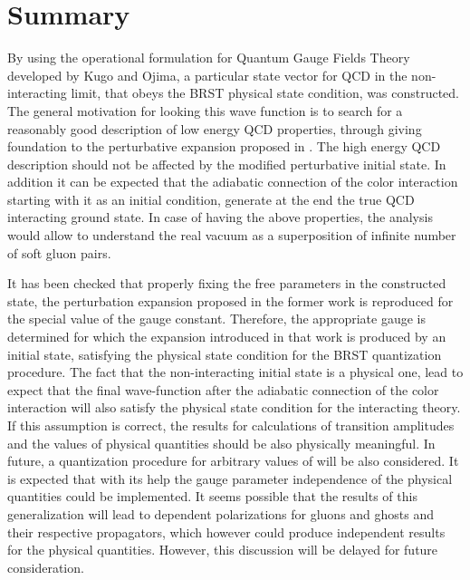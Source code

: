 \documentclass[12pt,letterpaper]{report}
\begin{document}
\chapter{Summary}

By using the operational formulation for Quantum Gauge Fields
Theory developed by Kugo and Ojima, a particular state vector for
QCD in the non-interacting limit, that obeys the BRST physical
state condition, was constructed. The general motivation for
looking this wave function is to search for a reasonably good
description of low energy QCD properties, through giving
foundation to the perturbative expansion proposed in \cite{Cabo}.
The high energy QCD description should not be affected by the
modified perturbative initial state. In addition it can be
expected that the adiabatic connection of the color interaction
starting with it as an initial condition, generate at the end the
true QCD interacting ground state. In case of having the above
properties, the analysis would allow to understand the real vacuum
as a superposition of infinite number of soft gluon pairs.

It has been checked that properly fixing the free parameters in
the constructed state, the perturbation expansion proposed in the
former work \cite{Cabo} is reproduced for the special value
\coordHE{} of the gauge constant. Therefore, the appropriate
gauge is determined for which the expansion introduced in that
work is produced by an initial state, satisfying the physical
state condition for the BRST quantization procedure. The fact that
the non-interacting initial state is a physical one, lead to
expect that the final wave-function after the adiabatic connection
of the color interaction will also satisfy the physical state
condition for the interacting theory. If this assumption is
correct, the results for calculations of transition amplitudes and
the values of physical quantities should be also physically
meaningful. In future, a quantization procedure for arbitrary
values of \myHighlight{$\alpha$}\coordHE{} will be also considered. It is expected that
with its help the gauge parameter independence of the physical
quantities could be implemented. It seems possible that the
results of this generalization will lead to \myHighlight{$\alpha $}\coordHE{} dependent
polarizations for gluons and ghosts and their respective
propagators, which however could produce \myHighlight{$\alpha $}\coordHE{} independent
results for the physical quantities. However, this discussion will
be delayed for future consideration.
\end{document}
